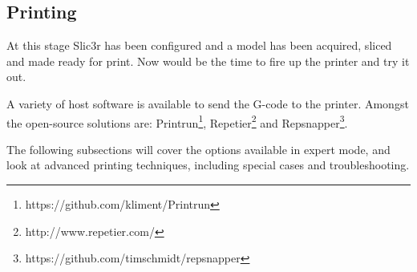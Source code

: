 
\subsection{Printing} %
\label{sec:printing}

At this stage Slic3r has been configured and a model has been acquired, sliced and made ready for print.  Now would be the time to fire up the printer and try it out.

A variety of host software is available to send the G-code to the printer.  Amongst the open-source solutions are: Printrun\footnote{https://github.com/kliment/Printrun}, Repetier\footnote{http://www.repetier.com/} and Repsnapper\footnote{https://github.com/timschmidt/repsnapper}.

The following subsections will cover the options available in expert mode, and look at advanced printing techniques, including special cases and troubleshooting.


